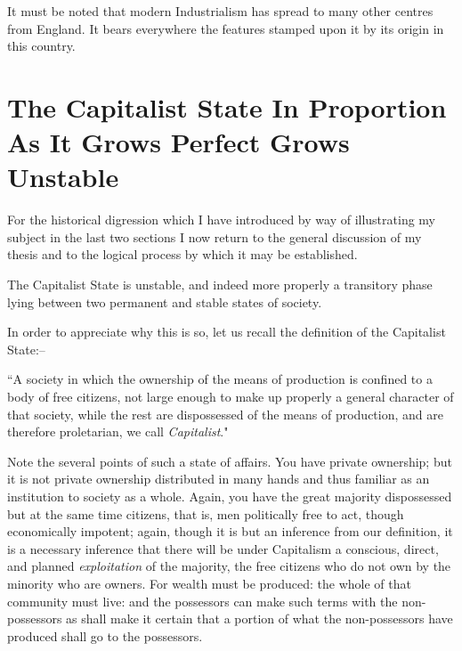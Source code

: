 \documentclass{book}
\begin{document}
It must be noted that modern Industrialism has spread to many other centres from England. It bears everywhere the features stamped upon it by its origin in this country.

\chapter{The Capitalist State In Proportion As It Grows Perfect Grows Unstable}
\label{chapter-5}
For the historical digression which I have introduced by way of illustrating my subject in the last two sections I now return to the general discussion of my thesis and to the logical process by which it may be established.

The Capitalist State is unstable, and indeed more properly a transitory phase lying between two permanent and stable states of society.

In order to appreciate why this is so, let us recall the definition of the Capitalist State:–

“A society in which the ownership of the means of production is confined to a body of free citizens, not large enough to make up properly a general character of that society, while the rest are dispossessed of the means of production, and are therefore proletarian, we call \emph{Capitalist}."

Note the several points of such a state of affairs. You have private ownership; but it is not private ownership distributed in many hands and thus familiar as an institution to society as a whole. Again, you have the great majority dispossessed but at the same time citizens, that is, men politically free to act, though economically impotent; again, though it is but an inference from our definition, it is a necessary inference that there will be under Capitalism a conscious, direct, and planned \emph{exploitation} of the majority, the free citizens who do not own by the minority who are owners. For wealth must be produced: the whole of that community must live: and the possessors can make such terms with the non-possessors as shall make it certain that a portion of what the non-possessors have produced shall go to the possessors.
\end{document}
